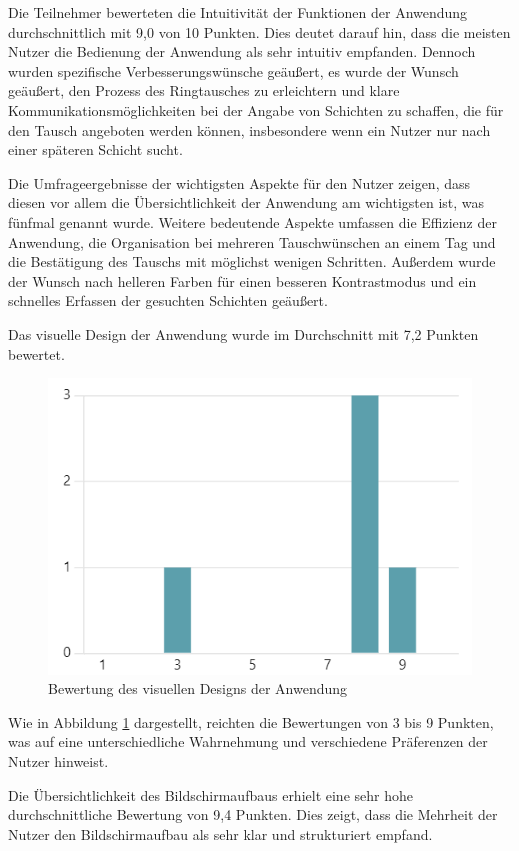 Die Teilnehmer bewerteten die Intuitivität der Funktionen der Anwendung durchschnittlich mit 9,0 von 10 Punkten. Dies deutet darauf hin, dass die meisten Nutzer die Bedienung der Anwendung als sehr intuitiv empfanden. Dennoch wurden spezifische Verbesserungswünsche geäußert, es wurde der Wunsch geäußert, den Prozess des Ringtausches zu erleichtern und klare Kommunikationsmöglichkeiten bei der Angabe von Schichten zu schaffen, die für den Tausch angeboten werden können, insbesondere wenn ein Nutzer nur nach einer späteren Schicht sucht.

Die Umfrageergebnisse der wichtigsten Aspekte für den Nutzer zeigen, dass diesen vor allem die Übersichtlichkeit der Anwendung am wichtigsten ist, was fünfmal genannt wurde. Weitere bedeutende Aspekte umfassen die Effizienz der Anwendung, die Organisation bei mehreren Tauschwünschen an einem Tag und die Bestätigung des Tauschs mit möglichst wenigen Schritten. Außerdem wurde der Wunsch nach helleren Farben für einen besseren Kontrastmodus und ein schnelles Erfassen der gesuchten Schichten geäußert.

Das visuelle Design der Anwendung wurde im Durchschnitt mit 7,2 Punkten bewertet. 

\begin{figure}[h]
    \centering
    \includegraphics[clip,width=0.65\linewidth]{images/Grafik_Umfrage_visuelles_Design.png}
    \caption[Bewertung des visuellen Designs der Anwendung]{Bewertung des visuellen Designs der Anwendung}
    \label{Grafik}
\end{figure}

Wie in Abbildung \ref{Grafik} dargestellt, reichten die Bewertungen von 3 bis 9 Punkten, was auf eine unterschiedliche Wahrnehmung und verschiedene Präferenzen der Nutzer hinweist.

Die Übersichtlichkeit des Bildschirmaufbaus erhielt eine sehr hohe durchschnittliche Bewertung von 9,4 Punkten. Dies zeigt, dass die Mehrheit der Nutzer den Bildschirmaufbau als sehr klar und strukturiert empfand.

